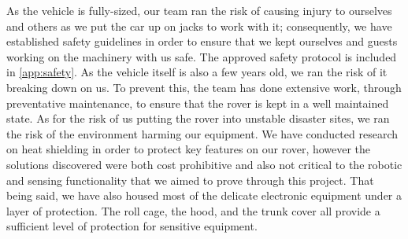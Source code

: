 As the vehicle is fully-sized, our team ran the risk of causing injury to ourselves and others as we put the car up on jacks to work with it; consequently, we have established safety guidelines in order to ensure that we kept ourselves and guests working on the machinery with us safe. The approved safety protocol is included in \ref{app:safety}. As the vehicle itself is also a few years old, we ran the risk of it breaking down on us. To prevent this, the team has done extensive work, through preventative maintenance, to ensure that the rover is kept in a well maintained state. As for the risk of us putting the rover into unstable disaster sites, we ran the risk of the environment harming our equipment. We have conducted research on heat shielding in order to protect key features on our rover, however the solutions discovered were both cost prohibitive and also not critical to the robotic and sensing functionality that we aimed to prove through this project. That being said, we have also housed most of the delicate electronic equipment under a layer of protection. The roll cage, the hood, and the trunk cover all provide a sufficient level of protection for sensitive equipment. 


